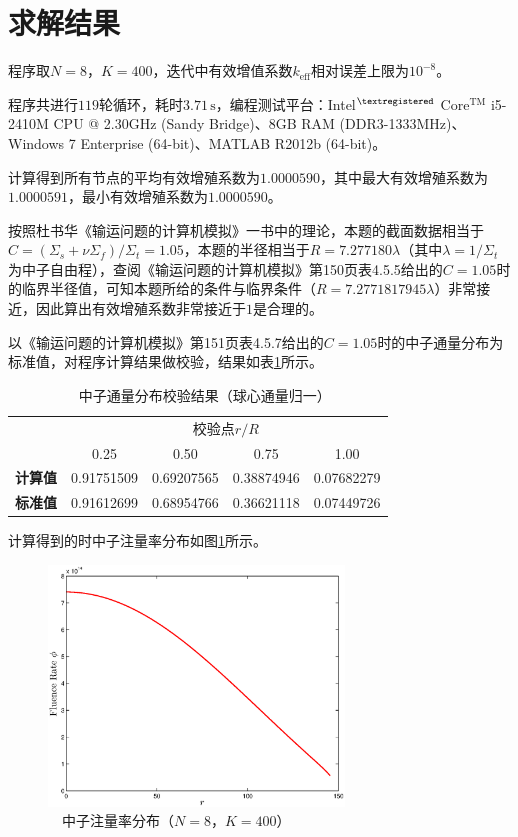 \documentclass[a4paper,10.5pt]{article}
\begin{document}
\section{求解结果}
程序取$N=8$，$K=400$，迭代中有效增值系数$k_{\mathrm{eff}}$相对误差上限为$10^{-8}$。\par
程序共进行$119$轮循环，耗时$3.71\,\mathrm{s}$，编程测试平台：Intel$ {}^{\textregistered}$ Core${}^{\mathrm{TM}}$ i5-2410M CPU @ 2.30GHz (Sandy Bridge)、8GB RAM (DDR3-1333MHz)、Windows 7 Enterprise (64-bit)、MATLAB R2012b (64-bit)。\par
计算得到所有节点的平均有效增殖系数为$1.0000590$，其中最大有效增殖系数为$1.0000591$，最小有效增殖系数为$1.0000590$。\par
按照杜书华《输运问题的计算机模拟》一书中的理论，本题的截面数据相当于$C=(\Sigma_{s}+\nu\Sigma_{f})/\Sigma_{t}=1.05$，本题的半径相当于$R=7.277180\lambda$（其中$\lambda=1/\Sigma_{t}$为中子自由程），查阅《输运问题的计算机模拟》第150页表4.5.5给出的$C=1.05$时的临界半径值，可知本题所给的条件与临界条件（$R=7.2771817945\lambda$）非常接近，因此算出有效增殖系数非常接近于$1$是合理的。\par
以《输运问题的计算机模拟》第151页表4.5.7给出的$C=1.05$时的中子通量分布为标准值，对程序计算结果做校验，结果如表\ref{tb:01}所示。\par
\begin{table}[htbp]
\centering
\caption{$\quad$中子通量分布校验结果（球心通量归一）}
\label{tb:01}
\begin{tabular}{c|c|c|c|c}
\hline
& \multicolumn{4}{|c}{校验点$r/R$}\\
\cline{2-5}
& 0.25 & 0.50 & 0.75 & 1.00\\
\hline
\textbf{计算值} & 0.91751509 & 0.69207565 & 0.38874946 & 0.07682279\\
\hline
\textbf{标准值} & 0.91612699 & 0.68954766 & 0.36621118 & 0.07449726\\
\hline
\end{tabular}
\end{table}
计算得到的时中子注量率分布如图\ref{fg:phi-rate-dist}所示。
\begin{figure}[htbp]
\centering
\includegraphics[width=0.7\textwidth]{1D_sphere_neutron_flux.eps}
\caption{$\quad$中子注量率分布（$N=8$，$K=400$）}
\label{fg:phi-rate-dist}
\end{figure}
\end{document}
